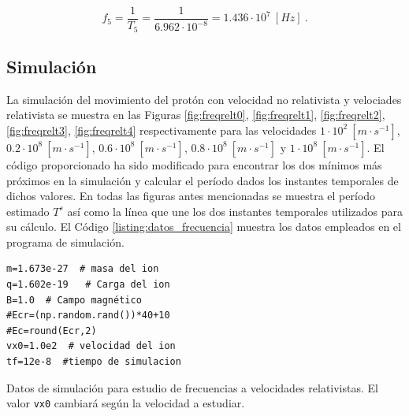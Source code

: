 \documentclass[journal]{IEEEtran}
\newenvironment{code}{\captionsetup{type=listing}}{\par\addvspace{\baselineskip}}
\begin{document}
\begin{equation}
f_5 = \displaystyle\frac{1}{T_5} = \displaystyle\frac{1}{6.962\cdot 10^{-8}} = 1.436\cdot 10^7~[Hz]~.
\end{equation}

\subsection{Simulación}

La simulación del movimiento del protón con velocidad no relativista y velociades relativista se muestra en las Figuras \ref{fig:freqrelt0}, \ref{fig:freqrelt1}, \ref{fig:freqrelt2}, \ref{fig:freqrelt3}, \ref{fig:freqrelt4} respectivamente para las velocidades $1\cdot 10^2~[m\cdot s^{-1}]$, $0.2\cdot 10^8~[m\cdot s^{-1}]$, $0.6\cdot 10^8~[m\cdot s^{-1}]$, $0.8\cdot 10^8~[m\cdot s^{-1}]$ y $1\cdot 10^8~[m\cdot s^{-1}]$. El código proporcionado ha sido modificado para encontrar los dos mínimos más próximos en la simulación y calcular el período dados los instantes temporales de dichos valores. En todas las figuras antes mencionadas se muestra el período estimado $T^s$ así como la línea que une los dos instantes temporales utilizados para su cálculo. El Código \ref{listing:datos_frecuencia} muestra los datos empleados en el programa de simulación.

\bigskip

\begin{code}
    \begin{verbatim}
m=1.673e-27  # masa del ion
q=1.602e-19   # Carga del ion
B=1.0  # Campo magnético
#Ecr=(np.random.rand())*40+10
#Ec=round(Ecr,2)
vx0=1.0e2  # velocidad del ion
tf=12e-8  #tiempo de simulacion
    \end{verbatim}
    \caption{Datos de simulación para estudio de frecuencias a velocidades relativistas. El valor \texttt{vx0} cambiará según la velocidad a estudiar.}
    \label{listing:datos_frecuencia}
\end{code}
\end{document}
